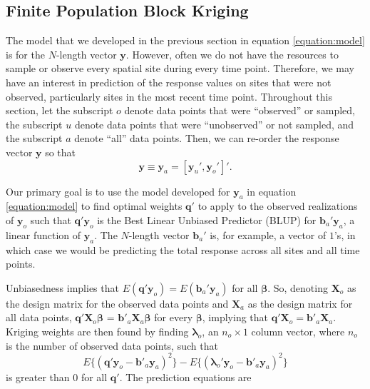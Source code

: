 \documentclass[smallextended]{svjour3}       %
\begin{document}
\hypertarget{subsection:fpbk}{%
\subsection{Finite Population Block Kriging}\label{subsection:fpbk}}

The model that we developed in the previous section in equation
\ref{equation:model} is for the \(N\)-length vector \(\mathbf{y}\).
However, often we do not have the resources to sample or observe every
spatial site during every time point. Therefore, we may have an interest
in prediction of the response values on sites that were not observed,
particularly sites in the most recent time point. Throughout this
section, let the subscript \(o\) denote data points that were
``observed'' or sampled, the subscript \(u\) denote data points that
were ``unobserved'' or not sampled, and the subscript \(a\) denote
``all'' data points. Then, we can re-order the response vector
\(\mathbf{y}\) so that \mbox{} \begin{equation} \label{equation:ordered}
\mathbf{y} \equiv \mathbf{y}_a = [\mathbf{y}_u', \mathbf{y}_o']'.
\end{equation}

Our primary goal is to use the model developed for \(\mathbf{y}_a\) in
equation \ref{equation:model} to find optimal weights \(\mathbf{q}'\) to
apply to the observed realizations of \(\mathbf{y}_o\) such that
\(\mathbf{q}' \mathbf{y}_o\) is the Best Linear Unbiased Predictor
(BLUP) for \(\mathbf{b}_a' \mathbf{y}_a\), a linear function of
\(\mathbf{y}_a\). The \(N\)-length vector \(\mathbf{b}_a'\) is, for
example, a vector of \(1\)'s, in which case we would be predicting the
total response across all sites and all time points.

Unbiasedness implies that
\(E(\mathbf{q'}\mathbf{y}_o) = E(\mathbf{b}_a'\mathbf{y}_a)\) for all
\(\bm{\beta}\). So, denoting \(\mathbf{X}_o\) as the design matrix for
the observed data points and \(\mathbf{X}_a\) as the design matrix for
all data points, \(\mathbf{q'} \mathbf{X}_o \bm{\beta}\) =
\(\mathbf{b'}_a \mathbf{X}_a \bm{\beta}\) for every \(\bm{\beta}\),
implying that \(\mathbf{q'} \mathbf{X}_o = \mathbf{b'}_a \mathbf{X}_a\).
Kriging weights are then found by finding \(\bm{\lambda}_o\), an
\(n_o \times 1\) column vector, where \(n_o\) is the number of observed
data points, such that \mbox{} \begin{equation}
E\{(\mathbf{q'}\mathbf{y}_o - \mathbf{b'}_a \mathbf{y}_a)^2\} - E\{(\bm{\lambda}_o'\mathbf{y}_o - \mathbf{b'}_a \mathbf{y}_a)^2\}
\end{equation} \noindent is greater than 0 for all \(\mathbf{q'}\). The
prediction equations are
\end{document}
